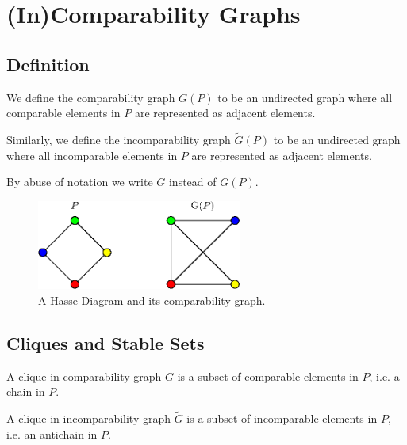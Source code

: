 \section{(In)Comparability Graphs}



\subsection{Definition}

We define the comparability graph ${G}(P)$ to be an undirected graph where all comparable elements in $P$ are represented as adjacent elements.

Similarly, we define the incomparability graph $\widetilde{G}(P)$ to be an undirected graph where all incomparable elements in $P$ are represented as adjacent elements.

By abuse of notation we write ${G}$ instead of ${G}(P)$.



\begin{figure}
	\centering
	\includegraphics[width=0.6\textwidth]{fig/comp-graph}
	\caption{\label{fig:comp-graph} A Hasse Diagram and its comparability graph.}
\end{figure}




\subsection{Cliques and Stable Sets}


A clique in comparability graph ${G}$ is a subset of comparable  elements in ${P}$, i.e. a chain in ${P}$.

A clique in incomparability graph $\widetilde{G}$ is a subset of incomparable  elements in ${P}$, i.e. an antichain in ${P}$.


